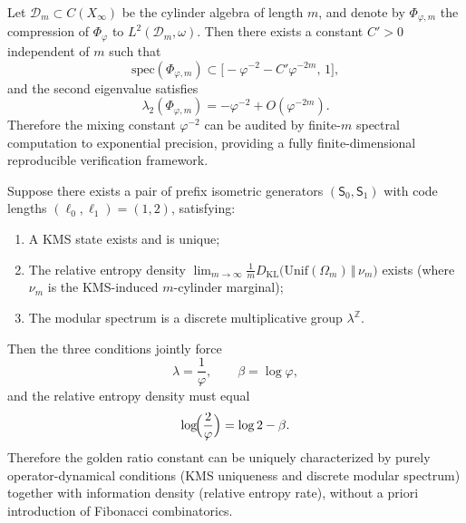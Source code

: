 \begin{proposition}\label{prop:xi-finite-truncation-spectrum-converges}
Let \(\mathcal D_m\subset C(X_\infty)\) be the cylinder algebra of length \(m\), and denote by \(\Phi_{\varphi,m}\) the compression of \(\Phi_\varphi\) to \(L^2(\mathcal D_m,\omega)\).
Then there exists a constant \(C'>0\) independent of \(m\) such that
\[
\mathrm{spec}(\Phi_{\varphi,m})\subset\bigl[-\varphi^{-2}-C'\varphi^{-2m},\,1\bigr],
\]
and the second eigenvalue satisfies
\[
\lambda_2(\Phi_{\varphi,m})=-\varphi^{-2}+O(\varphi^{-2m}).
\]
Therefore the mixing constant \(\varphi^{-2}\) can be audited by finite-\(m\) spectral computation to exponential precision, providing a fully finite-dimensional reproducible verification framework.
\end{proposition}

\begin{theorem}\label{thm:xi-phi-rigidity-from-kms-entropy-density}
Suppose there exists a pair of prefix isometric generators \((\mathsf{S}_0,\mathsf{S}_1)\) with code lengths \((\ell_0,\ell_1)=(1,2)\), satisfying:
\begin{enumerate}
  \item A KMS state exists and is unique;
  \item The relative entropy density
  \(\displaystyle \lim_{m\to\infty}\frac{1}{m}D_{\mathrm{KL}}\bigl(\mathrm{Unif}(\Omega_m)\,\Vert\,\nu_m\bigr)\)
  exists (where \(\nu_m\) is the KMS-induced \(m\)-cylinder marginal);
  \item The modular spectrum is a discrete multiplicative group \(\lambda^{\mathbb Z}\).
\end{enumerate}
Then the three conditions jointly force
\[
\lambda=\frac{1}{\varphi},
\qquad
\beta=\log\varphi,
\]
and the relative entropy density must equal
\[
\log\!\Bigl(\frac{2}{\varphi}\Bigr)=\log 2-\beta.
\]
Therefore the golden ratio constant can be uniquely characterized by purely operator-dynamical conditions (KMS uniqueness and discrete modular spectrum) together with information density (relative entropy rate), without a priori introduction of Fibonacci combinatorics.
\end{theorem}

